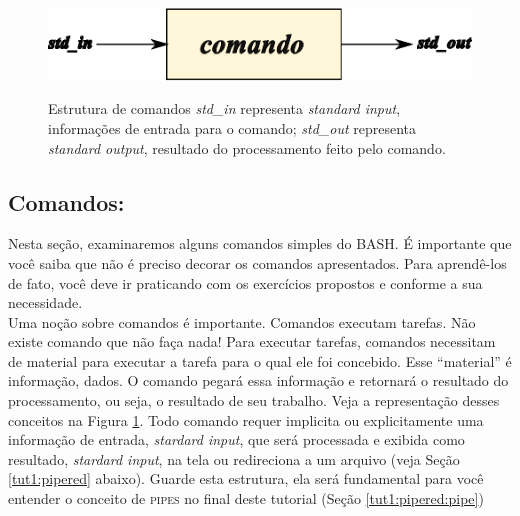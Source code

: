 \begin{refsection}
  \begin{figure}[H]
      {\includegraphics[scale=0.8]{figures/tut1/command_structure.eps}}
      {\caption[\textit{Estrutura de comandos}]{Estrutura de comandos\: \textit{std\_in} representa \textit{standard input}, informações de entrada para o comando;  \textit{std\_out} representa \textit{standard output}, resultado do processamento feito pelo comando.}\label{tut1:fig:commands}}

  \end{figure}


\subsection{Comandos:}\label{tut1:text_mode:commands:commands}
 Nesta seção, examinaremos alguns comandos simples do BASH. É importante que você saiba que não é preciso decorar os comandos apresentados. Para aprendê-los de fato, você deve ir praticando com os exercícios propostos e conforme a sua necessidade.\\
%
Uma noção sobre comandos é importante. Comandos executam tarefas. Não existe comando que não faça nada! Para executar tarefas, comandos necessitam de material para executar a tarefa para o qual ele foi concebido. Esse ``material'' é informação, dados. O comando pegará essa informação e retornará o resultado do processamento, ou seja, o resultado de seu trabalho. Veja a representação desses conceitos na Figura \ref{tut1:fig:commands}. Todo comando requer implicita ou explicitamente uma informação de entrada, \textit{stardard input}, que será processada e exibida como resultado, \textit{stardard input}, na tela ou redireciona a um arquivo (veja Seção \ref{tut1:pipered} abaixo). Guarde esta estrutura, ela será fundamental para você entender o conceito de \textsc{pipes} no final deste tutorial (Seção \ref{tut1:pipered:pipe})\\
%

\end{refsection}
